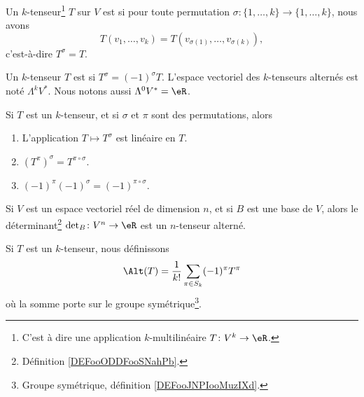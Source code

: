 \begin{definition}
	Un \( k\)-tenseur\footnote{C'est à dire une application \( k\)-multilinéaire \(T \colon V^k\to \eR  \).} \( T\) sur \( V\) est  si pour toute permutation \(\sigma \colon \{ 1,\ldots,k \}\to \{ 1,\ldots,k \}  \), nous avons
	\begin{equation}
		T(v_1,\ldots,v_k)=T(v_{\sigma(1)},\ldots,v_{\sigma(k)}),
	\end{equation}
	c'est-à-dire \( T^{\sigma}=T\).
\end{definition}

\begin{definition}
	Un \( k\)-tenseur \( T\) est  si \( T^{\sigma}=(-1)^{\sigma}T\). L'espace vectoriel des \( k\)-tenseurs alternés est noté \( \Lambda^kV^*\). Nous notons aussi \( \Lambda^0V^*=\eR\).
\end{definition}

\begin{lemma}		\label{LEMooJEZYooMmrtgu}
	Si \( T\) est un \( k\)-tenseur, et si \( \sigma\) et \( \pi\) sont des permutations, alors
	\begin{enumerate}
		\item
		      L'application \( T\mapsto T^{\sigma}\) est linéaire en \( T\).
		\item
		      \( (T^{\pi})^{\sigma}=T^{\pi\circ \sigma}\).
		\item
		      \( (-1)^{\pi}(-1)^{\sigma}=(-1)^{\pi\circ \sigma}\).
	\end{enumerate}
\end{lemma}


\begin{lemma}		\label{LEMooZMTPooKnqSuz}
	Si \( V\) est un espace vectoriel réel de dimension \( n\), et si \( B\) est une base de \( V\), alors le déterminant\footnote{Définition \ref{DEFooODDFooSNahPb}.} \(\det_B \colon V^n\to \eR  \) est un \( n\)-tenseur alterné.
\end{lemma}

\begin{definition}		\label{DEFooHAKAooIfbsEy}
	Si \( T\) est un \( k\)-tenseur, nous définissons
	\begin{equation}
		\Alt(T)=\frac{1}{ k!}\sum_{\pi\in S_k}(-1)^{\pi}T^{\pi}
	\end{equation}
	où la somme porte sur le groupe symétrique\footnote{Groupe symétrique, définition \ref{DEFooJNPIooMuzIXd}.}.
\end{definition}

